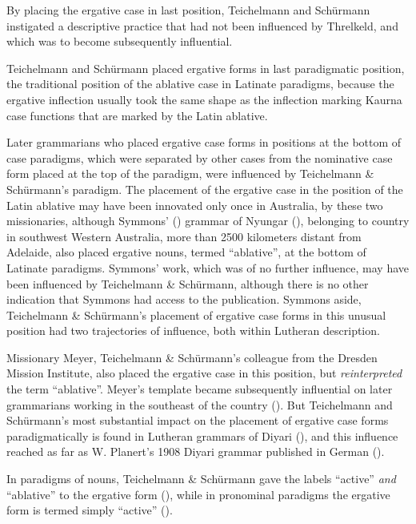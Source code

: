 By placing the ergative case in last position, Teichelmann and Schürmann instigated a descriptive practice that had not been influenced by Threlkeld, and which was to become subsequently influential. 

Teichelmann and Schürmann placed ergative forms in last paradigmatic position, the traditional position of the ablative case in Latinate paradigms, because the ergative inflection usually took the same shape as the inflection marking Kaurna case functions that are marked by the Latin ablative.

Later grammarians who placed ergative case forms in positions at the bottom of case paradigms, which were separated by other cases from the nominative case form placed at the top of the paradigm, were influenced by Teichelmann \& Schürmann’s paradigm. The placement of the ergative case in the position of the Latin ablative may have been innovated only once in Australia, by these two missionaries, although Symmons' (\citeyear{symmons_grammatical_1841}) grammar of Nyungar (), belonging to country in southwest Western Australia, more than 2500 kilometers distant from Adelaide, also placed ergative nouns, termed ``ablative'', at the bottom of Latinate paradigms. Symmons' work, which was of no further influence, may have been influenced by Teichelmann \& Schürmann, although there is no other indication that Symmons had access to the publication. Symmons aside, Teichelmann \& Schürmann’s placement of ergative case forms in this unusual position had two trajectories of influence, both within Lutheran description.

Missionary Meyer, Teichelmann \& Schürmann’s colleague from the Dresden Mission Institute, also placed the ergative case in this position, but \textit{reinterpreted} the term ``ablative''. Meyer’s template became subsequently influential on later grammarians working in the southeast of the country (). But Teichelmann and Schürmann’s most substantial impact on the placement of ergative case forms paradigmatically is found in Lutheran grammars of Diyari (), and this influence reached as far as W. Planert’s 1908 Diyari grammar published in German ().

In paradigms of nouns, Teichelmann \& Schürmann gave the labels “active” \textit{and} “ablative” to the ergative form (), while in pronominal paradigms the ergative form is termed simply “active” ().

